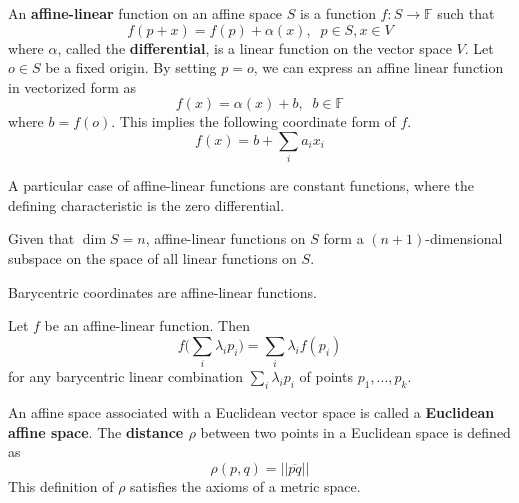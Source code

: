 \documentclass{article}
\begin{document}
    \begin{definition}
      An \textbf{affine-linear} function on an affine space $S$ is a function $f: S \longrightarrow \mathbb{F}$ such that
      \begin{equation}
        f(p + x) = f(p) + \alpha (x), \;\; p \in S , x \in V
      \end{equation}
      where $\alpha$, called the \textbf{differential}, is a linear function on the vector space $V$. Let $o \in S$ be a fixed origin. By setting $p = o$, we can express an affine linear function in vectorized form as 
      \begin{equation}
        f(x) = \alpha (x) + b, \;\; b \in \mathbb{F}
      \end{equation}
      where $b = f(o)$. This implies the following coordinate form of $f$. 
      \begin{equation}
        f(x) = b + \sum_i a_i x_i
      \end{equation}
    \end{definition}

    A particular case of affine-linear functions are constant functions, where the defining characteristic is the zero differential. 

    \begin{proposition}
      Given that $\dim{S} = n$, affine-linear functions on $S$ form a $(n+1)$-dimensional subspace on the space of all linear functions on $S$. 
    \end{proposition}

    \begin{proposition}
      Barycentric coordinates are affine-linear functions. 
    \end{proposition}

    \begin{proposition}
      Let $f$ be an affine-linear function. Then
      \begin{equation}
        f \bigg( \sum_i \lambda_i p_i \bigg) = \sum_i \lambda_i f(p_i)
      \end{equation}
      for any barycentric linear combination $\sum_i \lambda_i p_i$ of points $p_1, ..., p_k$. 
    \end{proposition}

    \begin{definition}
      An affine space associated with a Euclidean vector space is called a \textbf{Euclidean affine space}. The \textbf{distance $\rho$} between two points in a Euclidean space is defined as
      \begin{equation}
        \rho(p, q) = ||\overline{pq}||
      \end{equation}
      This definition of $\rho$ satisfies the axioms of a metric space. 
    \end{definition}
\end{document}
